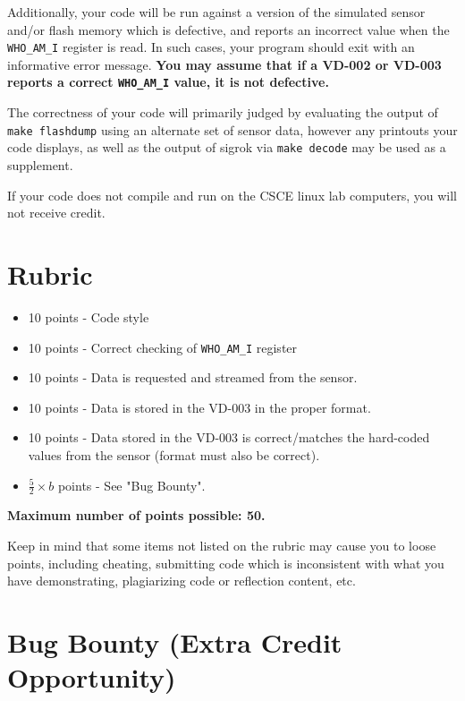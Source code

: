 \documentclass{article}
\begin{document}
Additionally, your code will be run against a version of the simulated sensor
and/or flash memory which is defective, and reports an incorrect value when the
\texttt{WHO\_AM\_I} register is read. In such cases, your program should exit
with an informative error message. \textbf{You may assume that if a VD-002 or
VD-003 reports a correct \texttt{WHO\_AM\_I} value, it is not defective.}

The correctness of your code will primarily judged by evaluating the output of
\texttt{make flashdump} using an alternate set of sensor data, however any
printouts your code displays, as well as the output of sigrok via \texttt{make
decode} may be used as a supplement.

If your code does not compile and run on the CSCE linux lab computers, you will
not receive credit.

\section{Rubric}

\begin{itemize}

	\item 10 points - Code style

	\item 10 points - Correct checking of \texttt{WHO\_AM\_I} register

	\item 10 points - Data is requested and streamed from the sensor.

	\item 10 points - Data is stored in the VD-003 in the proper format.

	\item 10 points - Data stored in the VD-003 is correct/matches the
		hard-coded values from the sensor (format must also be
		correct).

	\item $\frac{5}{2} \times b$ points - See "Bug Bounty".


\end{itemize}

\textbf{Maximum number of points possible: 50.}

Keep in mind that some items not listed on the rubric may cause you to loose
points, including cheating, submitting code which is inconsistent with what you
have demonstrating, plagiarizing code or reflection content, etc.

\section{Bug Bounty (Extra Credit Opportunity)}
\end{document}
